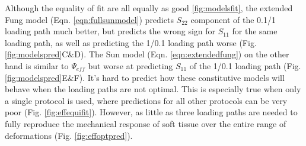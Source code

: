 	Although the equality of fit are all equally as good \ref{fig:modelsfit}, the extended Fung model (Eqn. \ref{eqn:fullsunmodel}) predicts $S_{22}$ component of the 0.1/1 loading path much better, but predicts the wrong sign for $S_{11}$ for the same loading path, as well as predicting the 1/0.1 loading path worse (Fig. \ref{fig:modelspred}C\&D). The Sun model (Eqn. \ref{eqn:extendedfung}) on the other hand is similar to $\Psi_{eff}$ but worse at predicting $S_{11}$ of the 1/0.1 loading path (Fig. \ref{fig:modelspred}E\&F). It's hard to predict how these constitutive models will behave when the loading paths are not optimal. This is especially true when only a single protocol is used, where predictions for all other protocols can be very poor (Fig. \ref{fig:effequifit}). However, as little as three loading paths are needed to fully reproduce the mechanical response of soft tissue over the entire range of deformations (Fig. \ref{fig:effoptpred}).
